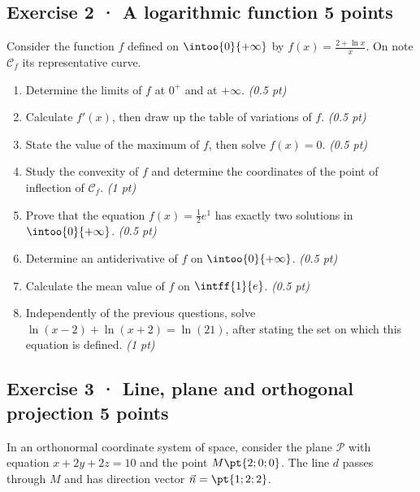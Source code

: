\subsection*{Exercise 2 · A logarithmic function \hfill 5 points}Consider the function $f$ defined on $\intoo{0}{+\infty}$ by $f(x)=\frac{2+\ln x}x$. On note $\mathcal C_f$ its representative curve.

\begin{enumerate}

\item Determine the limits of $f$ at $0^+$ and at $+\infty$. \hfill\textit{(0.5 pt)}

\item Calculate $f' (x)$, then draw up the table of variations of $f$. \hfill\textit{(0.5 pt)}

\item State the value of the maximum of $f$, then solve $f(x)=0$. \hfill\textit{(0.5 pt)}

\item Study the convexity of $f$ and determine the coordinates of the point of inflection of $\mathcal C_f$. \hfill\textit{(1 pt)}

\item Prove that the equation $f(x)=\frac12 e^{1}$ has exactly two solutions in $\intoo{0}{+\infty}$. \hfill\textit{(0.5 pt)}

\item Determine an antiderivative of $f$ on $\intoo{0}{+\infty}$. \hfill\textit{(0.5 pt)}

\item Calculate the mean value of $f$ on $\intff{1}{e}$. \hfill\textit{(0.5 pt)}

\item Independently of the previous questions, solve $\ln(x-2)+\ln(x+2)=\ln(21)$, after stating the set on which this equation is defined. \hfill\textit{(1 pt)}

\end{enumerate}

\mxnewpage{}

\subsection*{Exercise 3 · Line, plane and orthogonal projection \hfill 5 points}In an orthonormal coordinate system of space, consider the plane $\mathcal P$ with equation $x+2y+2z=10$ and the point $M\pt{2;0;0}$. The line $d$ passes through $M$ and has direction vector $\vec n=\pt{1;2;2}$.

